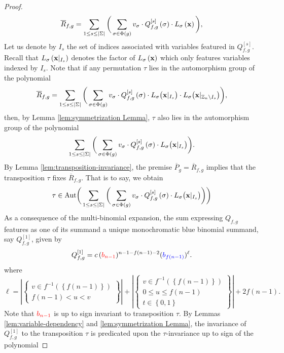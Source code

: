 \begin{proof}
\[
\overline{R}_{f,g}=\sum_{1\leq s\leq\left|\Sigma\right|}\bigg(\sum_{\sigma\in\Phi(g)}v_{\sigma}\cdot Q_{f,g}^{\left[s\right]}\left(\sigma\right)\cdot L_{\sigma}\left({\bf x}\right)\bigg),
\]
Let us denote by $I_s$ the set of indices associated with variables featured in $Q_{f,g}^{\left[s\right]}$. Recall that  $L_{\sigma}\left({\bf x}|_{I_{s}}\right)$ denotes the factor of $L_{\sigma}\left({\bf x}\right)$ which only features variables indexed by $I_s$. Note that if any permutation $\tau$ lies in the automorphism group of the polynomial
\[
\overline{R}_{f,g}=\sum_{1\leq s\leq\left|\Sigma\right|}\bigg(\sum_{\sigma\in\Phi(g)}v_{\sigma}\cdot Q_{f,g}^{\left[s\right]}\left(\sigma\right)\cdot L_{\sigma}\big({\bf x}|_{I_{s}}\big)\cdot L_{\sigma}\big({\bf x}|_{\mathbb{Z}_{n}\setminus I_{s}}\big)\bigg),
\]
then, by Lemma \ref{lem:symmetrization Lemma}, $\tau$ also lies in the automorphism group of the polynomial
\[
\sum_{1\leq s\leq\left|\Sigma\right|}\bigg(\sum_{\sigma\in\Phi(g)}v_{\sigma}\cdot Q_{f,g}^{\left[s\right]}\left(\sigma\right)\cdot L_{\sigma}\big({\bf x}|_{I_{s}}\big)\bigg).
\]
By Lemma \ref{lem:transposition-invariance}, the premise $\overline{P}_{g}=\overline{R}_{f,g}$
implies that the transposition $\tau$ fixes $\overline{R}_{f,g}$. That is to say, we obtain
\[
\tau \in \text{Aut}\bigg(\sum_{1\leq s\leq\left|\Sigma\right|}\bigg(\sum_{\sigma\in\Phi(g)}v_{\sigma}\cdot Q_{f,g}^{\left[s\right]}\left(\sigma\right)\cdot L_{\sigma}\big({\bf x}|_{I_{s}}\big)\bigg)
 \bigg)
\]
As a consequence of the multi-binomial expansion, the sum expressing
$Q_{f,g}$ features as one of its summand a unique monochromatic blue binomial summand, say $Q_{f,g}^{\left[1\right]}$, given by
\[
Q_{f,g}^{\left[1\right]}=c\,({\color{red}b_{n-1}})^{n-1-f(n-1)-2}({\color{blue}b_{f\left(n-1\right)}})^{\ell}.
\]
where
\[
\ell=\left|\left\{ \begin{array}{c}
v\in f^{-1}\left(\left\{ f\left(n-1\right)\right\} \right)\\
f\left(n-1\right)<u<v
\end{array}\right\} \right|+\left|\left\{ \begin{array}{c}
v\in f^{-1}\left(\left\{ f\left(n-1\right)\right\} \right)\\
0\le u\le f\left(n-1\right)\\
t\in\left\{ 0,1\right\} 
\end{array}\right\} \right|+2f(n-1).
\]
Note that ${\color{red}b_{n-1}}$ is up to sign invariant to transposition $\tau$. By Lemmas \ref{lem:variable-dependency} and \ref{lem:symmetrization Lemma}, the invariance of $Q_{f,g}^{\left[1\right]}$ to the transposition $\tau$ is predicated upon the $\tau$-invariance up to sign of the polynomial

\end{proof}
